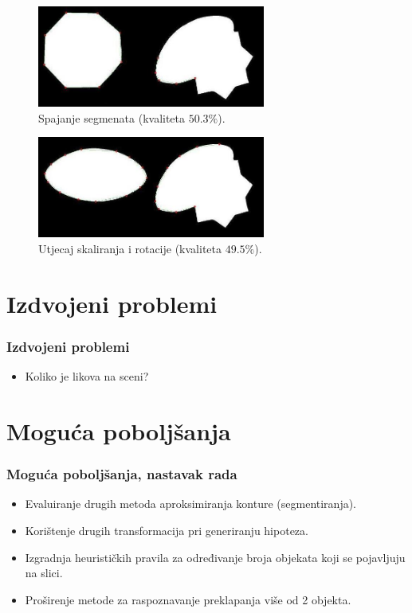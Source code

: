 \documentclass{beamer}
\begin{document}
\begin{frame}
\begin{figure}[!h]
\begin{center}
\includegraphics[width=7.5cm]{resources/oktagon-spoj.png}
\end{center}
\caption{Spajanje segmenata (kvaliteta $50.3\%$).} 
\label{fig:segmenti-treca}
\end{figure}
\begin{figure}[!h]
\begin{center}
\includegraphics[width=7.5cm]{resources/elipsa-spoj.png}
\end{center}
\caption{Utjecaj skaliranja i rotacije (kvaliteta $49.5\%$).} 
\label{fig:segmenti-rotacija}
\end{figure}
\end{frame}

\section{Izdvojeni problemi}
\begin{frame}
\frametitle{Izdvojeni problemi}
\begin{itemize}
  \item Koliko je likova na sceni?
\end{itemize}
\end{frame}

\section{Moguća poboljšanja}
\begin{frame}
\frametitle{Moguća poboljšanja, nastavak rada}
\begin{itemize}
  \item Evaluiranje drugih metoda aproksimiranja konture (segmentiranja).
  \item Korištenje drugih transformacija pri generiranju hipoteza. 
  \item Izgradnja heurističkih pravila za određivanje broja objekata koji se pojavljuju na slici.
  \item Proširenje metode za raspoznavanje preklapanja više od 2 objekta.
\end{itemize}
\end{frame}
\end{document}
